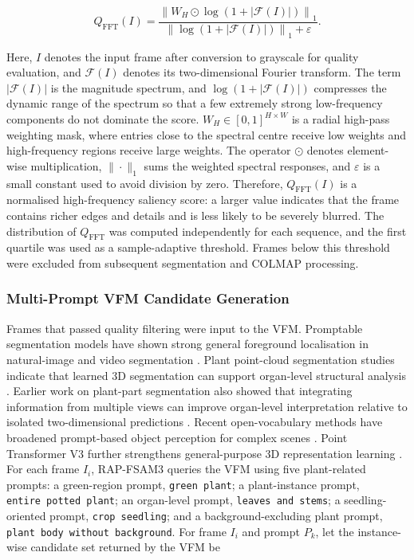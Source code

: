 \documentclass[a4paper]{cas-sc}
\begin{document}
\[
Q_{\text{FFT}}(I)=
\frac{\left\| W_H\odot \log\left(1+\left|\mathcal{F}(I)\right|\right)\right\|_1}
{\left\| \log\left(1+\left|\mathcal{F}(I)\right|\right)\right\|_1+\varepsilon} .
\]

Here, \(I\) denotes the input frame after conversion to grayscale for quality evaluation, and \(\mathcal{F}(I)\) denotes its two-dimensional Fourier transform. The term \(|\mathcal{F}(I)|\) is the magnitude spectrum, and \(\log(1+|\mathcal{F}(I)|)\) compresses the dynamic range of the spectrum so that a few extremely strong low-frequency components do not dominate the score. \(W_H\in[0,1]^{H\times W}\) is a radial high-pass weighting mask, where entries close to the spectral centre receive low weights and high-frequency regions receive large weights. The operator \(\odot\) denotes element-wise multiplication, \(\|\cdot\|_1\) sums the weighted spectral responses, and \(\varepsilon\) is a small constant used to avoid division by zero. Therefore, \(Q_{\text{FFT}}(I)\) is a normalised high-frequency saliency score: a larger value indicates that the frame contains richer edges and details and is less likely to be severely blurred. The distribution of \(Q_{\text{FFT}}\) was computed independently for each sequence, and the first quartile was used as a sample-adaptive threshold. Frames below this threshold were excluded from subsequent segmentation and COLMAP processing.

\subsubsection{Multi-Prompt VFM Candidate Generation}\label{sec:multi-prompt-vfm-candidates}

Frames that passed quality filtering were input to the VFM. Promptable segmentation models have shown strong general foreground localisation in natural-image and video segmentation \cite{ref38,ref39,ref71}. Plant point-cloud segmentation studies indicate that learned 3D segmentation can support organ-level structural analysis \cite{ref42,ref43}. Earlier work on plant-part segmentation also showed that integrating information from multiple views can improve organ-level interpretation relative to isolated two-dimensional predictions \cite{ref41}. Recent open-vocabulary methods have broadened prompt-based object perception for complex scenes \cite{ref40,ref64}. Point Transformer V3 further strengthens general-purpose 3D representation learning \cite{ref44}. For each frame \(I_i\), RAP-FSAM3 queries the VFM using five plant-related prompts: a green-region prompt, \texttt{green\ plant}; a plant-instance prompt, \texttt{entire\ potted\ plant}; an organ-level prompt, \texttt{leaves\ and\ stems}; a seedling-oriented prompt, \texttt{crop\ seedling}; and a background-excluding plant prompt, \texttt{plant\ body\ without\ background}. For frame \(I_i\) and prompt \(P_k\), let the instance-wise candidate set returned by the VFM be
\end{document}

